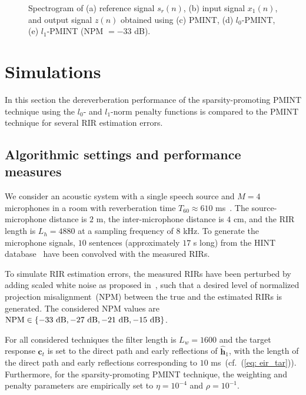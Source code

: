 \documentclass{article}
\begin{document}
\begin{figure}[t!]
  \centering
      
  \vspace{-0.7cm}
  \caption{Spectrogram of (a) reference signal $s_r(n)$, (b) input signal $x_1(n)$, and output signal $z(n)$ obtained using (c) PMINT, (d) $l_0$-PMINT, (e) $l_1$-PMINT (NPM $=-33$ dB).}
  \label{fig: spec}
\end{figure}

\section{Simulations}
\label{sec: simulations}
In this section the dereverberation performance of the sparsity-promoting PMINT technique using the $l_0$- and $l_1$-norm penalty functions is compared to the PMINT technique for several RIR estimation errors.

\subsection{Algorithmic settings and performance measures}
\label{sec: acsys}
We consider an acoustic system with a single speech source and $M=4$ microphones in a room with reverberation time $T_{60} \approx 610$ ms~\cite{hadad_IWAENC_2014}. 
The source-microphone distance is $2$ m, the inter-microphone distance is $4$ cm, and the RIR length is $L_h = 4880$ at a sampling frequency of $8$ kHz.
To generate the microphone signals, $10$ sentences (approximately $17$ s long) from the HINT database~\cite{Nilsson_JASA_1994} have been convolved with the measured RIRs.

To simulate RIR estimation errors, the measured RIRs have been perturbed by adding scaled white noise as proposed in~\cite{Zhang_HINDAWI_2008}, such that a desired level of normalized projection misalignment~(NPM) between the true and the estimated RIRs is generated. 
The considered NPM values are ${\text{NPM}} \in \{-33~{\rm dB},  -27~{\rm dB}, -21~{\rm dB}, -15~{\rm dB}\}$. 

For all considered techniques the filter length is $L_w = 1600$ and the target response $\mathbf{c}_t$ is set to the direct path and early reflections of $\hat{\mathbf{h}}_1$, with the length of the direct path and early reflections corresponding to $10$ ms~(cf.~(\ref{eq: eir_tar})).
Furthermore, for the sparsity-promoting PMINT technique, the weighting and penalty parameters are empirically set to $\eta = 10^{-4}$ and $\rho = 10^{-1}$.
\end{document}
